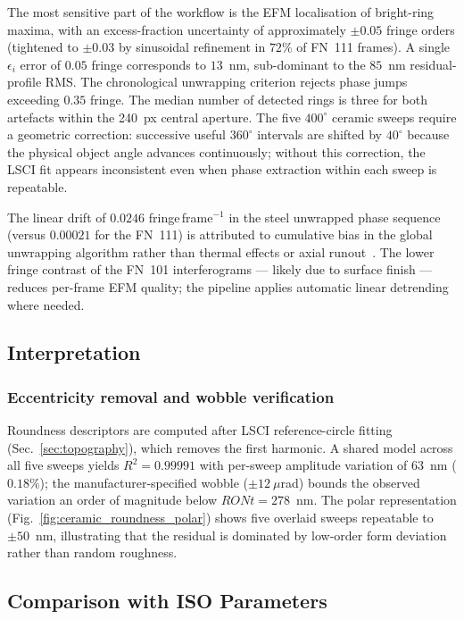 \documentclass[review]{elsarticle}
\begin{document}
The most sensitive part of the workflow is the EFM localisation of bright-ring maxima, with an excess-fraction uncertainty of approximately $\pm 0.05$ fringe orders (tightened to $\pm 0.03$ by sinusoidal refinement in $72\%$ of FN~111 frames). A single $\epsilon_i$ error of $0.05$ fringe corresponds to $13$~nm, sub-dominant to the $85$~nm residual-profile RMS. The chronological unwrapping criterion rejects phase jumps exceeding $0.35$ fringe. The median number of detected rings is three for both artefacts within the 240~px central aperture. The five $400^\circ$ ceramic sweeps require a geometric correction: successive useful $360^\circ$ intervals are shifted by $40^\circ$ because the physical object angle advances continuously; without this correction, the LSCI fit appears inconsistent even when phase extraction within each sweep is repeatable.

The linear drift of $0.0246$ fringe\,frame$^{-1}$ in the steel unwrapped phase sequence (versus $0.00021$ for the FN~111) is attributed to cumulative bias in the global unwrapping algorithm rather than thermal effects or axial runout~\cite{NewportCorporation:2018vk}.\label{sec:discussion_drift} The lower fringe contrast of the FN~101 interferograms — likely due to surface finish — reduces per-frame EFM quality; the pipeline applies automatic linear detrending where needed.

\subsection{Interpretation}

\subsubsection{Eccentricity removal and wobble verification}
\label{sec:eccentricity}
Roundness descriptors are computed after LSCI reference-circle fitting (Sec.~\ref{sec:topography}), which removes the first harmonic. A shared model across all five sweeps yields $R^2=0.99991$ with per-sweep amplitude variation of 63~nm ($0.18\%$); the manufacturer-specified wobble ($\pm 12~\mu$rad) bounds the observed variation an order of magnitude below $RONt=278$~nm. The polar representation (Fig.~\ref{fig:ceramic_roundness_polar}) shows five overlaid sweeps repeatable to $\pm 50$~nm, illustrating that the residual is dominated by low-order form deviation rather than random roughness.

\subsection{Comparison with ISO Parameters}
\label{sec:critical}
\end{document}

